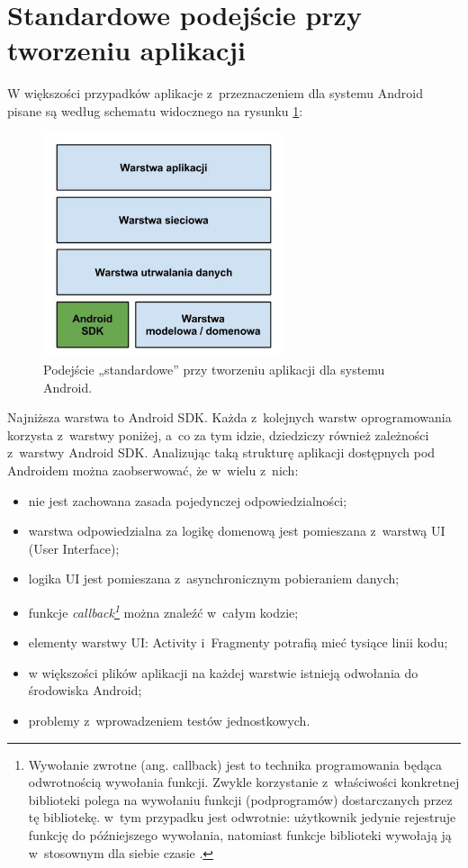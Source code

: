 \section{Standardowe podejście przy tworzeniu aplikacji}
\label{standardowe_podejscie}
W większości przypadków aplikacje z~przeznaczeniem dla systemu Android pisane są według schematu widocznego na rysunku \ref{fig:opis_problemu}:

\begin{figure}[!htb]
    \centering
    \includegraphics[width=7cm]{imgs/ch3_opis_problemu_1.jpg}
    \caption
{Podejście „standardowe” przy tworzeniu aplikacji dla systemu Android.}
    \label{fig:opis_problemu}
\end{figure} 

\newpage
Najniższa warstwa to Android SDK. Każda z~kolejnych warstw oprogramowania korzysta z~warstwy poniżej, a~co za tym idzie, dziedziczy również zależności z~warstwy Android SDK. Analizując taką strukturę aplikacji dostępnych pod Androidem można zaobserwować, że w~wielu z~nich:
\begin{itemize}
\item
nie jest zachowana zasada pojedynczej odpowiedzialności;
\item
warstwa odpowiedzialna za logikę domenową jest pomieszana z~warstwą UI (User Interface);
\item
logika UI jest pomieszana z~asynchronicznym pobieraniem danych;
\item
funkcje \textit{callback\footnote{Wywołanie zwrotne (ang. callback) jest to technika programowania będąca odwrotnością wywołania funkcji. Zwykle korzystanie z~właściwości konkretnej biblioteki polega na wywołaniu funkcji (podprogramów) dostarczanych przez tę bibliotekę. w~tym przypadku jest odwrotnie: użytkownik jedynie rejestruje funkcję do późniejszego wywołania, natomiast funkcje biblioteki wywołają ją w~stosownym dla siebie czasie  \cite{website:wikipedia}.}} można znaleźć w~całym kodzie;
\item
elementy warstwy UI: Activity i~Fragmenty potrafią mieć tysiące linii kodu;
\item
w większości plików aplikacji na każdej warstwie istnieją odwołania do środowiska Android;
\item
problemy z~wprowadzeniem testów jednostkowych.
\end{itemize}

